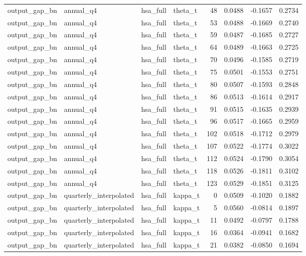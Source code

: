 \begin{tabular}{llllrrrr}
output\_gap\_bn & annual\_q4 & hsa\_full & theta\_t & 48 & 0.0488 & -0.1657 & 0.2734 \\
output\_gap\_bn & annual\_q4 & hsa\_full & theta\_t & 53 & 0.0488 & -0.1669 & 0.2740 \\
output\_gap\_bn & annual\_q4 & hsa\_full & theta\_t & 59 & 0.0487 & -0.1685 & 0.2727 \\
output\_gap\_bn & annual\_q4 & hsa\_full & theta\_t & 64 & 0.0489 & -0.1663 & 0.2725 \\
output\_gap\_bn & annual\_q4 & hsa\_full & theta\_t & 70 & 0.0496 & -0.1585 & 0.2719 \\
output\_gap\_bn & annual\_q4 & hsa\_full & theta\_t & 75 & 0.0501 & -0.1553 & 0.2751 \\
output\_gap\_bn & annual\_q4 & hsa\_full & theta\_t & 80 & 0.0507 & -0.1593 & 0.2848 \\
output\_gap\_bn & annual\_q4 & hsa\_full & theta\_t & 86 & 0.0513 & -0.1614 & 0.2917 \\
output\_gap\_bn & annual\_q4 & hsa\_full & theta\_t & 91 & 0.0515 & -0.1635 & 0.2939 \\
output\_gap\_bn & annual\_q4 & hsa\_full & theta\_t & 96 & 0.0517 & -0.1665 & 0.2959 \\
output\_gap\_bn & annual\_q4 & hsa\_full & theta\_t & 102 & 0.0518 & -0.1712 & 0.2979 \\
output\_gap\_bn & annual\_q4 & hsa\_full & theta\_t & 107 & 0.0522 & -0.1774 & 0.3022 \\
output\_gap\_bn & annual\_q4 & hsa\_full & theta\_t & 112 & 0.0524 & -0.1790 & 0.3054 \\
output\_gap\_bn & annual\_q4 & hsa\_full & theta\_t & 118 & 0.0526 & -0.1811 & 0.3102 \\
output\_gap\_bn & annual\_q4 & hsa\_full & theta\_t & 123 & 0.0529 & -0.1851 & 0.3125 \\
output\_gap\_bn & quarterly\_interpolated & hsa\_full & kappa\_t & 0 & 0.0509 & -0.1020 & 0.1882 \\
output\_gap\_bn & quarterly\_interpolated & hsa\_full & kappa\_t & 5 & 0.0560 & -0.0814 & 0.1897 \\
output\_gap\_bn & quarterly\_interpolated & hsa\_full & kappa\_t & 11 & 0.0492 & -0.0797 & 0.1788 \\
output\_gap\_bn & quarterly\_interpolated & hsa\_full & kappa\_t & 16 & 0.0364 & -0.0941 & 0.1682 \\
output\_gap\_bn & quarterly\_interpolated & hsa\_full & kappa\_t & 21 & 0.0382 & -0.0850 & 0.1694 \\

\end{tabular}
